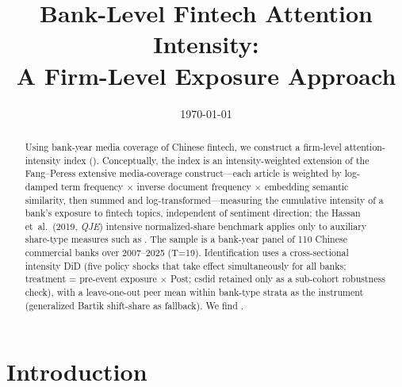 




\title{Bank-Level Fintech Attention Intensity:\\A Firm-Level Exposure Approach}
\author{}
\date{\today}


\maketitle

\begin{abstract}
Using bank-year media coverage of Chinese fintech, we construct a firm-level
attention-intensity index (). Conceptually, the
index is an intensity-weighted extension of the Fang--Peress extensive
media-coverage construct---each article is weighted by log-damped term
frequency $\times$ inverse document frequency $\times$ embedding semantic
similarity, then summed and log-transformed---measuring the cumulative
intensity of a bank's exposure to fintech topics, independent of sentiment
direction; the Hassan et~al.\ (2019, \emph{QJE}) intensive normalized-share
benchmark applies only to auxiliary share-type measures such as
. The sample is a bank-year panel of 110 Chinese
commercial banks  over 2007--2025 (T=19).
Identification uses a cross-sectional intensity DiD (five policy shocks that
take effect simultaneously for all banks; treatment = pre-event exposure
$\times$ Post; csdid retained only as a sub-cohort robustness check), with a
leave-one-out peer mean within bank-type strata as the instrument (generalized
Bartik shift-share as fallback). We find \@.
\end{abstract}

\section{Introduction}\label{sec:intro}


